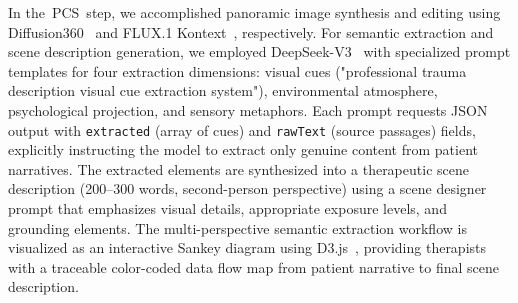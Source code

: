 \documentclass[]{interact}
\newcommand{\stepbs}{PCS}
\begin{document}

In the~\stepbs~step, we accomplished panoramic image synthesis and editing using Diffusion360~\cite{Feng2023Diffusion360} and FLUX.1 Kontext~\cite{Labs2025Flux}, respectively. For semantic extraction and scene description generation, we employed DeepSeek-V3~\cite{deepseekv3} with specialized prompt templates for four extraction dimensions: visual cues ("professional trauma description visual cue extraction system"), environmental atmosphere, psychological projection, and sensory metaphors. Each prompt requests JSON output with \texttt{extracted} (array of cues) and \texttt{rawText} (source passages) fields, explicitly instructing the model to extract only genuine content from patient narratives. The extracted elements are synthesized into a therapeutic scene description (200--300 words, second-person perspective) using a scene designer prompt that emphasizes visual details, appropriate exposure levels, and grounding elements. The multi-perspective semantic extraction workflow is visualized as an interactive Sankey diagram using D3.js~\cite{Jain2014D3}, providing therapists with a traceable color-coded data flow map from patient narrative to final scene description.

\end{document}
